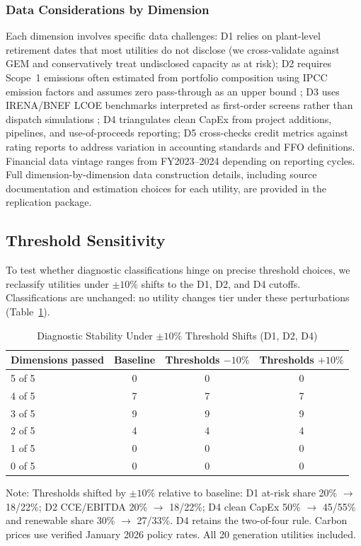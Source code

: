 \documentclass[review,3p,authoryear]{elsarticle}
\begin{document}
\subsubsection*{Data Considerations by Dimension}

Each dimension involves specific data challenges: D1 relies on plant-level retirement dates that most utilities do not disclose (we cross-validate against GEM and conservatively treat undisclosed capacity as at risk); D2 requires Scope~1 emissions often estimated from portfolio composition using IPCC emission factors \citep{IPCC2006} and assumes zero pass-through as an upper bound \citep{Sijm2006}; D3 uses IRENA/BNEF LCOE benchmarks interpreted as first-order screens rather than dispatch simulations \citep{Hirth2015}; D4 triangulates clean CapEx from project additions, pipelines, and use-of-proceeds reporting; D5 cross-checks credit metrics against rating reports to address variation in accounting standards and FFO definitions. Financial data vintage ranges from FY2023--2024 depending on reporting cycles. Full dimension-by-dimension data construction details, including source documentation and estimation choices for each utility, are provided in the replication package.

\subsection{Threshold Sensitivity}

To test whether diagnostic classifications hinge on precise threshold choices, we reclassify utilities under $\pm10\%$ shifts to the D1, D2, and D4 cutoffs. Classifications are unchanged: no utility changes tier under these perturbations (Table~\ref{tab:threshold_sensitivity}).

\begin{table}[H]
\centering
\caption{Diagnostic Stability Under $\pm10\%$ Threshold Shifts (D1, D2, D4)}
\label{tab:threshold_sensitivity}
\small
\begin{tabular}{@{}lccc@{}}
\toprule
\textbf{Dimensions passed} & \textbf{Baseline} & \textbf{Thresholds $-10\%$} & \textbf{Thresholds $+10\%$} \\
\midrule
5 of 5 & 0 & 0 & 0 \\
4 of 5 & 7 & 7 & 7 \\
3 of 5 & 9 & 9 & 9 \\
2 of 5 & 4 & 4 & 4 \\
1 of 5 & 0 & 0 & 0 \\
0 of 5 & 0 & 0 & 0 \\
\bottomrule
\end{tabular}
\begin{flushleft}
\footnotesize{Note: Thresholds shifted by $\pm10\%$ relative to baseline: D1 at-risk share 20\% $\rightarrow$ 18/22\%; D2 CCE/EBITDA 20\% $\rightarrow$ 18/22\%; D4 clean CapEx 50\% $\rightarrow$ 45/55\% and renewable share 30\% $\rightarrow$ 27/33\%. D4 retains the two-of-four rule. Carbon prices use verified January 2026 policy rates. All 20 generation utilities included.}
\end{flushleft}
\end{table}
\end{document}
